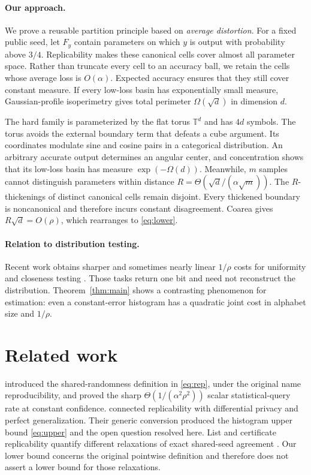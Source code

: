 \documentclass[twoside]{article}
\theoremstyle{definition}
\newcommand{\T}{\mathbb T}
\newcommand{\1}{\mathbf 1}
\begin{document}
\paragraph{Our approach.}
We prove a reusable partition principle based on \emph{average distortion}. For a fixed public seed, let $F_y$ contain parameters on which $y$ is output with probability above $3/4$. Replicability makes these canonical cells cover almost all parameter space. Rather than truncate every cell to an accuracy ball, we retain the cells whose average loss is $O(\alpha)$. Expected accuracy ensures that they still cover constant measure. If every low-loss basin has exponentially small measure, Gaussian-profile isoperimetry gives total perimeter $\Omega(\sqrt d)$ in dimension $d$.

The hard family is parameterized by the flat torus $\T^d$ and has $4d$ symbols. The torus avoids the external boundary term that defeats a cube argument. Its coordinates modulate sine and cosine pairs in a categorical distribution. An arbitrary accurate output determines an angular center, and concentration shows that its low-loss basin has measure $\exp(-\Omega(d))$. Meanwhile, $m$ samples cannot distinguish parameters within distance $R=\Theta(\sqrt d/(\alpha\sqrt m))$. The $R$-thickenings of distinct canonical cells remain disjoint. Every thickened boundary is noncanonical and therefore incurs constant disagreement. Coarea gives $R\sqrt d=O(\rho)$, which rearranges to \eqref{eq:lower}.

\paragraph{Relation to distribution testing.}
Recent work obtains sharper and sometimes nearly linear $1/\rho$ costs for uniformity and closeness testing \citep{liu2024,diakonikolas2025,aamand2025}. Those tasks return one bit and need not reconstruct the distribution. Theorem~\ref{thm:main} shows a contrasting phenomenon for estimation: even a constant-error histogram has a quadratic joint cost in alphabet size and $1/\rho$.

\section{Related work}

\citet{impagliazzo2022} introduced the shared-randomness definition in \eqref{eq:rep}, under the original name reproducibility, and proved the sharp $\Theta(1/(\alpha^2\rho^2))$ scalar statistical-query rate at constant confidence. \citet{bun2023} connected replicability with differential privacy and perfect generalization. Their generic conversion produced the histogram upper bound \eqref{eq:upper} and the open question resolved here. List and certificate replicability quantify different relaxations of exact shared-seed agreement \citep{dixon2023}. Our lower bound concerns the original pointwise definition and therefore does not assert a lower bound for those relaxations.
\end{document}
